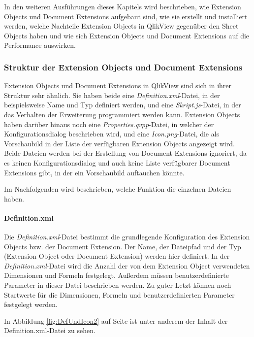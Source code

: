 In den weiteren Ausführungen dieses Kapitels wird beschrieben, wie Extension Objects und Document Extensions aufgebaut sind, wie sie erstellt und installiert werden, welche Nachteile Extension Objects in QlikView gegenüber den Sheet Objects haben und wie sich Extension Objects und Document Extensions auf die Performance auswirken.



\subsubsection{Struktur der Extension Objects und Document Extensions}

Extension Objects und Document Extensions in QlikView sind sich in ihrer Struktur sehr ähnlich. Sie haben beide eine \textit{Definition.xml}-Datei, in der beispielsweise Name und Typ definiert werden, und eine \textit{Skript.js}-Datei, in der das Verhalten der Erweiterung programmiert werden kann. Extension Objects haben darüber hinaus noch eine \textit{Properties.qvpp}-Datei, in welcher der Konfigurations\-dialog beschrieben wird, und eine \textit{Icon.png}-Datei, die als Vorschaubild in der Liste der verfügbaren Extension Objects angezeigt wird. Beide Dateien werden bei der Erstellung von Document Extensions ignoriert, da es keinen Konfigurations\-dialog und auch keine Liste verfügbarer Document Extensions gibt, in der ein Vorschaubild auftauchen könnte.

Im Nachfolgenden wird beschrieben, welche Funktion die einzelnen Dateien haben. 

\paragraph{Definition.xml}

Die \textit{Definition.xml}-Datei bestimmt die grundlegende Konfiguration des Extension Objects bzw. der Document Extension. Der Name, der Datei\-pfad und der Typ (Extension Object oder Document Extension) werden hier definiert. In der \textit{Definition.xml}-Datei wird die Anzahl der von dem Extension Object verwendeten Dimensionen und Formeln festgelegt. Außerdem müssen benutzerdefinierte Parameter in dieser Datei beschrieben werden. Zu guter Letzt können noch Startwerte für die Dimensionen, Formeln und benutzerdefinierten Parameter festgelegt werden.

In Abbildung \ref{fig:DefUndIcon2} auf Seite \pageref{fig:DefUndIcon2} ist unter anderem der Inhalt der Definition.xml-Datei zu sehen.

